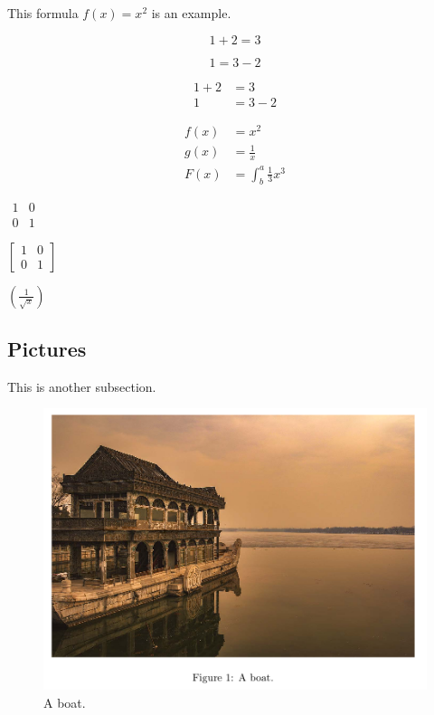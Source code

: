 \documentclass{article}
\begin{document}
	This formula $f(x) = x^2$ is an example.
	
	\begin{equation*}
	1 + 2 = 3
	\end{equation*}
	
	\begin{equation*}
	1 = 3 - 2
	\end{equation*}
	
	\begin{align*}
	1 + 2 &= 3\\
	1 &= 3 -2
	\end{align*}
	
	\begin{align*}
		f(x) & = x^2                     \\
		g(x) & = \frac{1}{x}             \\
		F(x) & = \int^a_b \frac{1}{3}x^3
	\end{align*}
		
	$\begin{matrix}
		1 & 0\\
		0 & 1
	\end{matrix}$
	
	$\left[
	\begin{matrix}
		1 & 0\\
		0 & 1
	\end{matrix}
	\right]$
	
	$ \left(\frac{1}{\sqrt{x}}\right) $
	
	\subsection{Pictures}
	  This is another subsection.
	  
	\begin{figure}[!ht]
		\includegraphics[width=\linewidth]{source/boat.jpg}
		\caption{A boat.}
		\label{fig:boat1}
	\end{figure}
	
\end{document}
